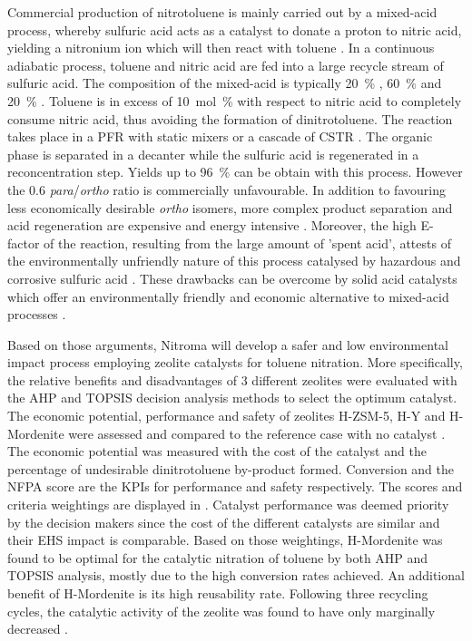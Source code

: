 Commercial production of nitrotoluene is mainly carried out by a mixed-acid process, whereby sulfuric acid acts as a catalyst to donate a proton to nitric acid, yielding a nitronium ion which will then react with toluene \cite{halder_nitration_2007}. In a continuous adiabatic process, toluene and nitric acid are fed into a large recycle stream of sulfuric acid. The composition of the mixed-acid is typically \SI{20}{\percent} , \SI{60}{\percent}  and \SI{20}{\percent}  \cite{pande_nitration_2010}. Toluene is in excess of \SI{10}{mol\percent} with respect to nitric acid to completely consume nitric acid, thus avoiding the formation of dinitrotoluene. The reaction takes place in a PFR with static mixers or a cascade of CSTR \cite{dugal_nitrobenzene_2005}. The organic phase is separated in a decanter while the sulfuric acid is regenerated in a reconcentration step. Yields up to \SI{96}{\percent} can be obtain with this process. However the 0.6 \textit{para}/\textit{ortho} ratio is commercially unfavourable. In addition to favouring less economically desirable \textit{ortho} isomers, more complex product separation and acid regeneration are expensive and energy intensive \cite{sreedhar_scientific_2013}. Moreover, the high E-factor of the reaction, resulting from the large amount of 'spent acid', attests of the environmentally unfriendly nature of this process catalysed by hazardous and corrosive sulfuric acid \cite{pande_nitration_2010}. These drawbacks can be overcome by solid acid catalysts which offer an environmentally friendly and economic alternative to mixed-acid processes \cite{vassena_selective_1999}.

 Based on those arguments, Nitroma will develop a safer and low environmental impact process employing zeolite catalysts for toluene nitration. More specifically, the relative benefits and disadvantages of 3 different zeolites were evaluated with the AHP and TOPSIS decision analysis methods to select the optimum catalyst. The economic potential, performance and safety of zeolites H-ZSM-5, H-Y and H-Mordenite were assessed and compared to the reference case with no catalyst \cite{jeeru_kinetics_2018}. The economic potential was measured with the cost of the catalyst and the percentage of undesirable dinitrotoluene by-product formed. Conversion and the NFPA score are the KPIs for performance and safety respectively. The scores and criteria weightings are displayed in . Catalyst performance was deemed priority by the decision makers since the cost of the different catalysts are similar and their EHS impact is comparable. Based on those weightings, H-Mordenite was found to be optimal for the catalytic nitration of toluene by both AHP and TOPSIS analysis, mostly due to the high conversion rates achieved. An additional benefit of H-Mordenite is its high reusability rate. Following three recycling cycles, the catalytic activity of the zeolite was found to have only marginally decreased \cite{jeeru_kinetics_2018}. 


